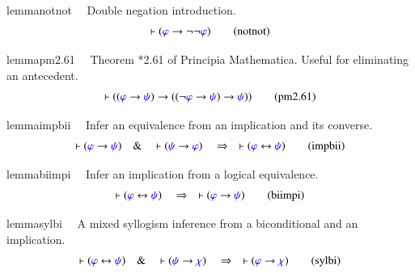 \begin{restatable}{lemma}{notnot}~~ Double negation introduction. 
\begin{align}
\vdash ( \mw{\varphi} \rightarrow \lnot \lnot \mw{\varphi}
    )\label{eq:notnot}\tag{notnot}
\end{align}
\end{restatable}

\begin{restatable}{lemma}{pm2.61}~~ Theorem *2.61 of Principia Mathematica. 
Useful for eliminating an antecedent. 
\begin{align}
\vdash ( ( \mw{\varphi} \rightarrow \mw{\psi} ) \rightarrow ( ( \lnot
    \mw{\varphi} \rightarrow \mw{\psi} ) \rightarrow \mw{\psi} )
    )\label{eq:pm2.61}\tag{pm2.61}
\end{align}
\end{restatable}

\begin{restatable}{lemma}{impbii}~~ Infer an equivalence from an implication and
its converse.  
\begin{align}
\vdash ( \mw{\varphi} \rightarrow \mw{\psi} )\quad\&\quad \vdash ( \mw{\psi}
    \rightarrow \mw{\varphi} )\quad\Rightarrow\quad \vdash ( \mw{\varphi}
    \leftrightarrow \mw{\psi} )\label{eq:impbii}\tag{impbii}
\end{align}
\end{restatable}

\begin{restatable}{lemma}{biimpi}~~ Infer an implication from a logical
equivalence.  
\begin{align}
\vdash ( \mw{\varphi} \leftrightarrow \mw{\psi} )\quad\Rightarrow\quad \vdash (
    \mw{\varphi} \rightarrow \mw{\psi} )\label{eq:biimpi}\tag{biimpi}
\end{align}
\end{restatable}

\begin{restatable}{lemma}{sylbi}~~ A mixed syllogism inference from a
biconditional and an implication.
\begin{align}
\vdash ( \mw{\varphi} \leftrightarrow \mw{\psi} )\quad\&\quad \vdash (
    \mw{\psi} \rightarrow \mw{\chi} )\quad\Rightarrow\quad \vdash (
    \mw{\varphi} \rightarrow \mw{\chi} )\label{eq:sylbi}\tag{sylbi}
\end{align}
\end{restatable}


